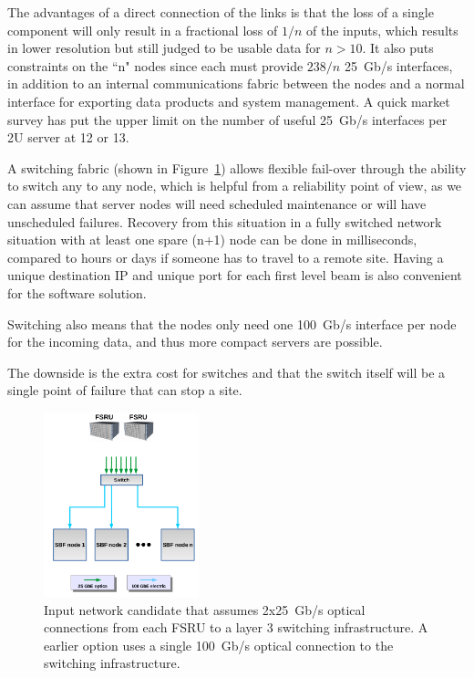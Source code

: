 \documentclass[12pt,a4paper]{article}
\begin{document}
The advantages of a direct connection of the \fsru links is that the loss of a single component will only result in a fractional loss of $1/n$ of the inputs, which results in lower resolution but still judged to be usable data for $n>10$. 
It also puts constraints on the ``n" \RB nodes since each must provide $238/n$ 25~Gb/s interfaces, in addition to an internal communications fabric between the \RB nodes and a normal interface for exporting data products and system management. 
A quick market survey has put the upper limit on the number of useful 25~Gb/s interfaces per 
2U server at 12 or 13.

A switching fabric (shown in Figure~\ref{fig:network-layer}) allows flexible fail-over through the ability to switch any \fsru to any \RB node, which is helpful from a reliability point of view, as we can assume that server nodes will need scheduled maintenance or will have unscheduled failures.
Recovery from this situation in a fully switched network situation with at least one spare (n+1) \RB node can be done in milliseconds, compared to hours or days if someone has to travel to a remote site. Having a unique destination IP and unique port for each first level beam is also convenient for the software solution.

Switching also means that the \RB nodes only need one 100~Gb/s interface per node for the incoming data, and thus more compact servers are possible.

The downside is the extra cost for switches and that the switch itself will be a single point of failure that can stop a site.

\begin{figure}[ht]
\centering
\includegraphics[width=0.4\textwidth]{input_network_8.png}
\caption{Input network candidate that assumes 2x25~Gb/s optical connections from each FSRU to a layer 3 switching infrastructure. A earlier option uses a single 100~Gb/s optical connection to the switching infrastructure. \label{fig:network-layer}
}
\end{figure}
\end{document}
